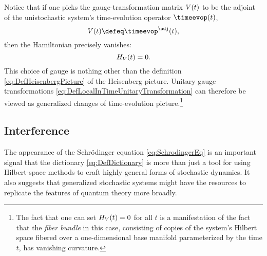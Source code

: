 \documentclass[12pt,english,prl,superscriptaddress,nobibnotes,nofootinbib]{revtex4-2}
\let\originalleft\left
\let\originalright\right
\renewcommand{\left}{\mathopen{}\mathclose\bgroup\originalleft}
\renewcommand{\right}{\aftergroup\egroup\originalright}
\begin{document}
Notice that if one picks the gauge-transformation matrix $V\left(t\right)$
to be the adjoint of the unistochastic system's time-evolution operator
$\timeevop\left(t\right)$, 
\begin{equation}
V\left(t\right)\defeq\timeevop^{\adj}\left(t\right),\label{eq:DefLocalInTimeUnitaryTransformationForHeisenbergPicture}
\end{equation}
 then the Hamiltonian precisely vanishes: 
\begin{equation}
H_{V}\left(t\right)=0.\label{eq:DefLocalInTimeUnitaryTransformationForHeisenbergPictureHamiltonianZero}
\end{equation}
 This choice of gauge is nothing other than the definition \eqref{eq:DefHeisenbergPicture}
of the Heisenberg picture. Unitary gauge transformations \eqref{eq:DefLocalInTimeUnitaryTransformation}
can therefore be viewed as generalized changes of time-evolution picture.\footnote{The fact that one can set $H_{V}\left(t\right)=0$ for all $t$ is
a manifestation of the fact that the \emph{fiber bundle} in this
case, consisting of copies of the system's Hilbert space fibered over
a one-dimensional base manifold parameterized by the time $t$, has
vanishing curvature.}

\subsection{Interference\label{subsec:Interference}}

The appearance of the Schr{\" o}dinger equation \eqref{eq:SchrodingerEq}
is an important signal that the dictionary \eqref{eq:DefDictionary}
is more than just a tool for using Hilbert-space methods to craft
highly general forms of stochastic dynamics. It also suggests that
generalized stochastic systems might have the resources to replicate
the features of quantum theory more broadly.
\end{document}
